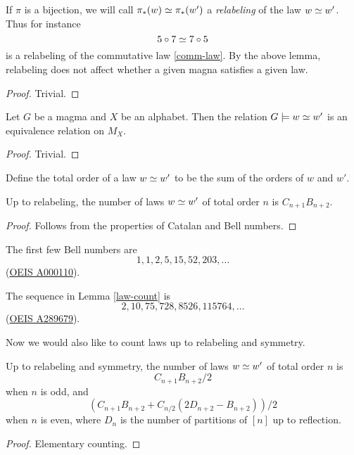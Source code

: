 If $\pi$ is a bijection, we will call $\pi_*(w) \simeq \pi_*(w')$ a \emph{relabeling} of the law $w \simeq w'$.  Thus for instance
$$ 5 \circ 7 \simeq 7 \circ 5$$
is a relabeling of the commutative law \eqref{comm-law}.  By the above lemma, relabeling does not affect whether a given magna satisfies a given law.

\begin{proof}  Trivial.
\end{proof}

\begin{lemma}[Equivalence]\label{equiv}  Let $G$ be a magma and $X$ be an alphabet.  Then the relation $G \models w \simeq w'$ is an equivalence relation on $M_X$.
\end{lemma}

\begin{proof}  Trivial.
\end{proof}

Define the total order of a law $w \simeq w'$ to be the sum of the orders of $w$ and $w'$.

\begin{lemma}\label{law-count}  Up to relabeling, the number of laws $w \simeq w'$ of total order $n$ is $C_{n+1} B_{n+2}$.
\end{lemma}

\begin{proof} Follows from the properties of Catalan and Bell numbers.
\end{proof}

The first few Bell numbers are
$$ 1, 1, 2, 5, 15, 52, 203, \dots$$
(\href{https://oeis.org/A000110}{OEIS A000110}).

The sequence in Lemma \ref{law-count} is
$$ 2, 10, 75, 728, 8526, 115764, \dots$$
(\href{https://oeis.org/A289679}{OEIS A289679}).

Now we would also like to count laws up to relabeling and symmetry.

\begin{lemma}\label{law-count-sym} Up to relabeling and symmetry, the number of laws $w \simeq w'$ of total order $n$ is
$$ C_{n+1} B_{n+2}/2$$
when $n$ is odd, and
$$ (C_{n+1} B_{n+2} + C_{n/2} (2D_{n+2} - B_{n+2}))/2$$
when $n$ is even, where $D_n$ is the number of partitions of $[n]$ up to reflection.
\end{lemma}

\begin{proof} Elementary counting.
\end{proof}


